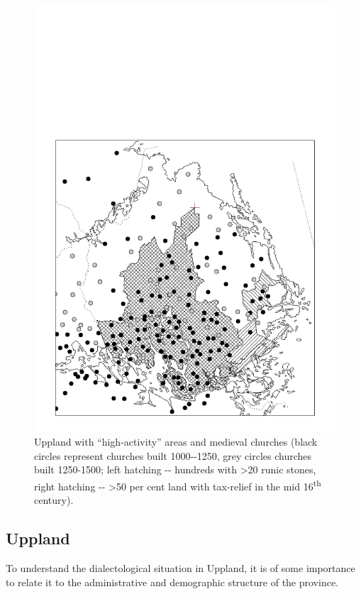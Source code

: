  
\begin{figure}[h]
\includegraphics[height=.5\textheight]{figures/44_UpplandHighActivity}
\caption{Uppland with “high-activity” areas  and medieval churches (black circles represent churches built 1000-{}-1250, grey circles churches built 1250-1500; left hatching  {}-{}- hundreds with {\textgreater}20 runic stones, right hatching  {}-{}- {\textgreater}50 per cent land with tax-relief in the mid 16\textsuperscript{th} century).}
\label{map:38}
\end{figure}

  

\subsection{Uppland}

To understand the dialectological situation in Uppland, it is of some importance to relate it to the administrative and demographic structure of the province.

